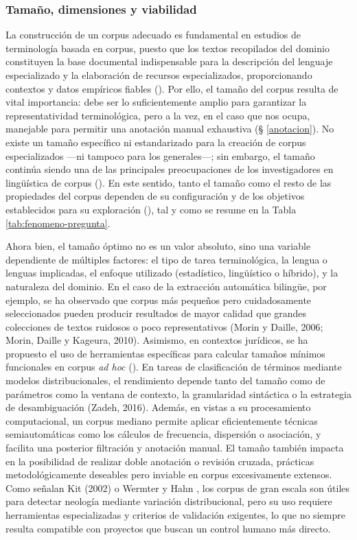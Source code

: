 \subsubsection{Tamaño, dimensiones y viabilidad}
La construcción de un corpus adecuado es fundamental en estudios de terminología basada en corpus, puesto que los textos recopilados del dominio constituyen la base documental indispensable para la descripción del lenguaje especializado y la elaboración de recursos especializados, proporcionando contextos y datos empíricos fiables (\cite{cabre1999terminology,picht1985terminology}). Por ello, el tamaño del corpus resulta de vital importancia: debe ser lo suficientemente amplio para garantizar la representatividad terminológica, pero a la vez, en el caso que nos ocupa, manejable para permitir una anotación manual exhaustiva (§ \ref{anotacion}). No existe un tamaño específico ni estandarizado para la creación de corpus especializados —ni tampoco para los generales—; sin embargo, el tamaño continúa siendo una de las principales preocupaciones de los investigadores en lingüística de corpus (\cite{Egbert_Biber_Gray_2022}). En este sentido, tanto el tamaño como el resto de las propiedades del corpus dependen de su configuración y de los objetivos establecidos para su exploración (\cite{rojo2021introduccion}), tal y como se resume en la Tabla \ref{tab:fenomeno-pregunta}.
  

Ahora bien, el tamaño óptimo no es un valor absoluto, sino una variable dependiente de múltiples factores: el tipo de tarea terminológica, la lengua o lenguas implicadas, el enfoque utilizado (estadístico, lingüístico o híbrido), y la naturaleza del dominio. En el caso de la extracción automática bilingüe, por ejemplo, se ha observado que corpus más pequeños pero cuidadosamente seleccionados pueden producir resultados de mayor calidad que grandes colecciones de textos ruidosos o poco representativos (Morin y Daille, 2006; Morin, Daille y Kageura, 2010). Asimismo, en contextos jurídicos, se ha propuesto el uso de herramientas específicas para calcular tamaños mínimos funcionales en corpus \textit{ad hoc} (\cite{seghiri2014toobig}). En tareas de clasificación de términos mediante modelos distribucionales, el rendimiento depende tanto del tamaño como de parámetros como la ventana de contexto, la granularidad sintáctica o la estrategia de desambiguación (Zadeh, 2016). Además, en vistas a su procesamiento computacional, un corpus mediano permite aplicar eficientemente técnicas semiautomáticas como los cálculos de frecuencia, dispersión o asociación, y facilita una posterior filtración y anotación manual. El tamaño también impacta en la posibilidad de realizar doble anotación o revisión cruzada, prácticas metodológicamente deseables pero inviable en corpus excesivamente extensos. Como señalan Kit (2002) o Wermter y Hahn \citeyear{wermter2005finding}, los corpus de gran escala son útiles para detectar neología mediante variación distribucional, pero su uso requiere herramientas especializadas y criterios de validación exigentes, lo que no siempre resulta compatible con proyectos que buscan un control humano más directo.

